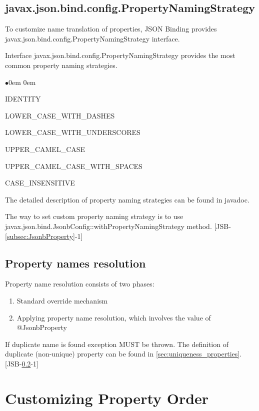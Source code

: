 \subsection{javax.json.bind.config.PropertyNamingStrategy}
\label{subsec:PropertyNamingStrategy}

To customize name translation of properties, JSON Binding provides javax.json.bind.config.PropertyNamingStrategy interface.

Interface javax.json.bind.config.PropertyNamingStrategy provides the most common property naming strategies.

\begin{list}{$\bullet$}{\parsep 0em  0em}
\item IDENTITY
\item LOWER\_CASE\_WITH\_DASHES
\item LOWER\_CASE\_WITH\_UNDERSCORES
\item UPPER\_CAMEL\_CASE
\item UPPER\_CAMEL\_CASE\_WITH\_SPACES
\item CASE\_INSENSITIVE
\end{list}

The detailed description of property naming strategies can be found in javadoc.

The way to set custom property naming strategy is to use javax.json.bind.JsonbConfig::withPropertyNamingStrategy method. [JSB-\ref{subsec:JsonbProperty}-1]

\subsection{Property names resolution}
\label{sec:property_names_resolution}
Property name resolution consists of two phases:
\begin{enumerate}{\parsep 0em  0em}
\setlength{\itemsep}{0cm}%
\setlength{\parskip}{0cm}%
\item Standard override mechanism
\item Applying property name resolution, which involves the value of @JsonbProperty
\end{enumerate}

If duplicate name is found exception MUST be thrown.
The definition of duplicate (non-unique) property can be found in \ref{sec:uniqueness_properties}. [JSB-\ref{sec:property_names_resolution}-1]


\section{Customizing Property Order}
\label{sec:custom_property_order}

